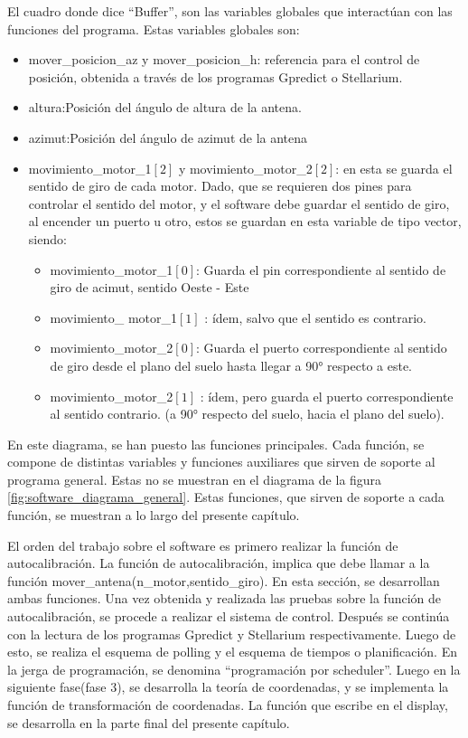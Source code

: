 El cuadro donde dice ``Buffer'', son las variables globales que interactúan con las funciones del programa. Estas variables globales son: 
\begin{itemize}
	\item mover\_posicion\_az y mover\_posicion\_h: referencia para el control de posición, obtenida a través de los programas Gpredict o Stellarium.  
	\item altura:Posición del ángulo de altura de la antena. 
	\item azimut:Posición del ángulo de azimut de la antena
	\item movimiento\_motor\_1$[2]$  y movimiento\_motor\_2$[2]$: en esta se guarda el sentido de giro de cada motor. Dado, que se requieren dos pines para controlar el sentido del motor, y el software debe guardar el sentido de giro, al encender un puerto u otro, estos se guardan en esta variable de tipo vector, siendo: 
		\begin{itemize}
			\item movimiento\_motor\_1$[0]$: Guarda el pin correspondiente al sentido de giro de acimut, sentido Oeste - Este 
			\item movimiento\_ motor\_1$[1]$ : ídem, salvo que el sentido es contrario.  
			\item movimiento\_motor\_2$[0]$: Guarda el puerto correspondiente al sentido de giro desde el plano del suelo hasta llegar a 90° respecto a este. 
			\item movimiento\_motor\_2$[1]$ : ídem, pero guarda el puerto correspondiente al sentido contrario. (a 90° respecto del suelo, hacia el plano del suelo). 			
		\end{itemize}
	
\end{itemize}  

En este diagrama, se han puesto las funciones principales. Cada función, se compone de distintas variables y funciones auxiliares que sirven de soporte al programa general. Estas no se muestran en el diagrama de la figura \ref{fig:software_diagrama_general}. Estas funciones, que sirven de soporte a cada función, se muestran a lo largo del presente capítulo. 


%

El orden del trabajo sobre el software es primero realizar la función de autocalibración. La función de autocalibración, implica que debe llamar a la función mover\_antena(n\_motor,sentido\_giro). En esta sección, se desarrollan ambas funciones. Una vez obtenida y realizada las pruebas sobre la función de autocalibración, se procede a realizar el sistema de control. Después se continúa con la lectura de los programas Gpredict y Stellarium respectivamente. Luego de esto, se realiza el esquema de polling y el esquema de tiempos o planificación. En la jerga de programación, se denomina ``programación por scheduler''. Luego en la siguiente fase(fase 3), se desarrolla la teoría de coordenadas, y se implementa la función de transformación de coordenadas. La función que escribe en el display, se desarrolla en la parte final del presente capítulo. 




